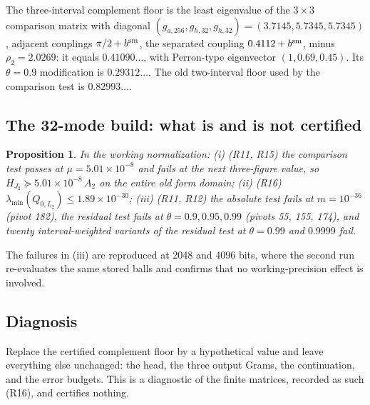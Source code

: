 \documentclass[11pt]{article}
\numberwithin{equation}{section}
\newtheorem{proposition}[theorem]{Proposition}
\theoremstyle{definition}
\theoremstyle{remark}
\newcommand{\Ltwo}{L_2}
\newcommand{\MuTwo}{5.01\times10^{-8}}                         %
\newcommand{\UpperLtwo}{1.89\times10^{-30}}                 %
\begin{document}
The three-interval complement floor is the least eigenvalue of the $3\times3$ comparison matrix with diagonal $(g_{a,256},g_{h,32},g_{h,32})=(3.7145,5.7345,5.7345)$, adjacent couplings $\pi/2+b^{\rm sm}$, the separated coupling $0.4112+b^{\rm sm}$, minus $\rho_2=2.0269$: it equals $0.41090\ldots$, with Perron-type eigenvector $(1,0.69,0.45)$. Its $\theta=0.9$ modification is $0.29312\ldots$. The old two-interval floor used by the comparison test is $0.82993\ldots$.

\subsection{The 32-mode build: what is and is not certified}
\begin{proposition}\label{prop:second}
In the working normalization: (i) (R11, R15) the comparison test passes at $\mu=\MuTwo$ and fails at the next three-figure value, so $H_{J_2}\succeq\MuTwo\,A_2$ on the entire old form domain; (ii) (R16) $\lambda_{\min}(Q_{0,\Ltwo})\le\UpperLtwo$; (iii) (R11, R12) the absolute test fails at $m=10^{-36}$ (pivot 182), the residual test fails at $\theta=0.9,0.95,0.99$ (pivots 55, 155, 174), and twenty interval-weighted variants of the residual test at $\theta=0.99$ and $0.9999$ fail.
\end{proposition}
The failures in (iii) are reproduced at 2048 and 4096 bits, where the second run re-evaluates the same stored balls and confirms that no working-precision effect is involved.

\subsection{Diagnosis}\label{sec:diagnosis}
Replace the certified complement floor by a hypothetical value and leave everything else unchanged: the head, the three output Grams, the continuation, and the error budgets. This is a diagnostic of the finite matrices, recorded as such (R16), and certifies nothing.
\end{document}
